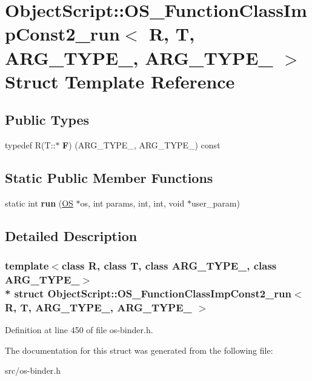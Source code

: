 \hypertarget{struct_object_script_1_1_o_s___function_class_imp_const2__run}{}\section{Object\+Script\+:\+:O\+S\+\_\+\+Function\+Class\+Imp\+Const2\+\_\+run$<$ R, T, A\+R\+G\+\_\+\+T\+Y\+P\+E\+\_, A\+R\+G\+\_\+\+T\+Y\+P\+E\+\_ $>$ Struct Template Reference}
\label{struct_object_script_1_1_o_s___function_class_imp_const2__run}
\subsection*{Public Types}
\begin{DoxyCompactItemize}
\item 
typedef R(T\+::$\ast$ {\bfseries F}) (A\+R\+G\+\_\+\+T\+Y\+P\+E\+\_, A\+R\+G\+\_\+\+T\+Y\+P\+E\+\_) const \hypertarget{struct_object_script_1_1_o_s___function_class_imp_const2__run_a0e352d61e921be40a48abc65eb8db53a}{}\label{struct_object_script_1_1_o_s___function_class_imp_const2__run_a0e352d61e921be40a48abc65eb8db53a}

\end{DoxyCompactItemize}
\subsection*{Static Public Member Functions}
\begin{DoxyCompactItemize}
\item 
static int {\bfseries run} (\hyperlink{class_object_script_1_1_o_s}{OS} $\ast$os, int params, int, int, void $\ast$user\+\_\+param)\hypertarget{struct_object_script_1_1_o_s___function_class_imp_const2__run_a28bdce81a19adaa98f0c5a02cdde4913}{}\label{struct_object_script_1_1_o_s___function_class_imp_const2__run_a28bdce81a19adaa98f0c5a02cdde4913}

\end{DoxyCompactItemize}


\subsection{Detailed Description}
\subsubsection*{template$<$class R, class T, class A\+R\+G\+\_\+\+T\+Y\+P\+E\+\_, class A\+R\+G\+\_\+\+T\+Y\+P\+E\+\_$>$\\*
struct Object\+Script\+::\+O\+S\+\_\+\+Function\+Class\+Imp\+Const2\+\_\+run$<$ R, T, A\+R\+G\+\_\+\+T\+Y\+P\+E\+\_, A\+R\+G\+\_\+\+T\+Y\+P\+E\+\_ $>$}



Definition at line 450 of file os-\/binder.\+h.



The documentation for this struct was generated from the following file\+:\begin{DoxyCompactItemize}
\item 
src/os-\/binder.\+h\end{DoxyCompactItemize}

